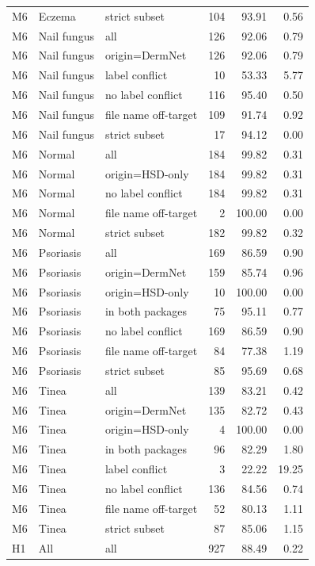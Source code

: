 \begin{tabular}{lllrrr}
M6 & Eczema & strict subset & 104 & 93.91 & 0.56 \\
M6 & Nail fungus & all & 126 & 92.06 & 0.79 \\
M6 & Nail fungus & origin=DermNet & 126 & 92.06 & 0.79 \\
M6 & Nail fungus & label conflict & 10 & 53.33 & 5.77 \\
M6 & Nail fungus & no label conflict & 116 & 95.40 & 0.50 \\
M6 & Nail fungus & file name off-target & 109 & 91.74 & 0.92 \\
M6 & Nail fungus & strict subset & 17 & 94.12 & 0.00 \\
M6 & Normal & all & 184 & 99.82 & 0.31 \\
M6 & Normal & origin=HSD-only & 184 & 99.82 & 0.31 \\
M6 & Normal & no label conflict & 184 & 99.82 & 0.31 \\
M6 & Normal & file name off-target & 2 & 100.00 & 0.00 \\
M6 & Normal & strict subset & 182 & 99.82 & 0.32 \\
M6 & Psoriasis & all & 169 & 86.59 & 0.90 \\
M6 & Psoriasis & origin=DermNet & 159 & 85.74 & 0.96 \\
M6 & Psoriasis & origin=HSD-only & 10 & 100.00 & 0.00 \\
M6 & Psoriasis & in both packages & 75 & 95.11 & 0.77 \\
M6 & Psoriasis & no label conflict & 169 & 86.59 & 0.90 \\
M6 & Psoriasis & file name off-target & 84 & 77.38 & 1.19 \\
M6 & Psoriasis & strict subset & 85 & 95.69 & 0.68 \\
M6 & Tinea & all & 139 & 83.21 & 0.42 \\
M6 & Tinea & origin=DermNet & 135 & 82.72 & 0.43 \\
M6 & Tinea & origin=HSD-only & 4 & 100.00 & 0.00 \\
M6 & Tinea & in both packages & 96 & 82.29 & 1.80 \\
M6 & Tinea & label conflict & 3 & 22.22 & 19.25 \\
M6 & Tinea & no label conflict & 136 & 84.56 & 0.74 \\
M6 & Tinea & file name off-target & 52 & 80.13 & 1.11 \\
M6 & Tinea & strict subset & 87 & 85.06 & 1.15 \\
H1 & All & all & 927 & 88.49 & 0.22 \\

\end{tabular}
